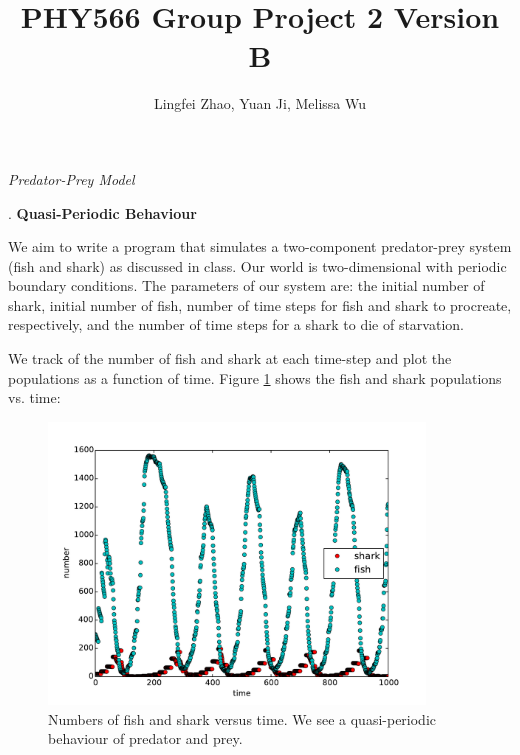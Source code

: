 \documentclass{article}
\begin{document}
\title{PHY566 Group Project 2 Version B}
\author{Lingfei Zhao, Yuan Ji, Melissa Wu}
\maketitle

\begin{center}
\textit{\large Predator-Prey Model}\par
\end{center}
\bigskip
{}. \textbf{Quasi-Periodic Behaviour}\par
\smallskip
We aim to write a program that simulates a two-component predator-prey system (fish and shark) as discussed in class. Our world is two-dimensional with periodic boundary conditions. The parameters of our system are: the initial number of shark, initial number of fish, number of time steps for fish and shark to procreate, respectively, and the number of time steps for a shark to die of starvation.\par
\smallskip
We track of the number of fish and shark at each time-step and plot the populations as a function of time. Figure \ref{fig:graph} shows the fish and shark populations vs. time:\par
\begin{figure}[H]
\centering
\captionsetup{justification=centering, margin=3 cm}
\includegraphics[width=10cm]{PP.pdf}
\caption{Numbers of fish and shark versus time. We see a quasi-periodic behaviour of predator and prey.}
\label{fig:graph}
\end{figure}
\end{document}
